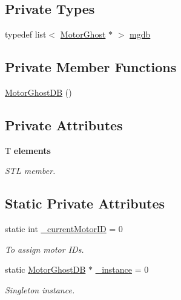 \subsection*{Private Types}
\begin{DoxyCompactItemize}
\item 
typedef list$<$ \hyperlink{classMotorGhost}{Motor\+Ghost} $\ast$ $>$ \hyperlink{classMotorGhostDB_aba9303a159c2a7c47299b005604a9fab}{mgdb}
\end{DoxyCompactItemize}
\subsection*{Private Member Functions}
\begin{DoxyCompactItemize}
\item 
\hyperlink{classMotorGhostDB_a41b6fa66ce424e660cf21fb5f1473e41}{Motor\+Ghost\+D\+B} ()
\end{DoxyCompactItemize}
\subsection*{Private Attributes}
\begin{DoxyCompactItemize}
\item 
T {\bfseries elements}
\begin{DoxyCompactList}\small\item\em S\+T\+L member. \end{DoxyCompactList}\end{DoxyCompactItemize}
\subsection*{Static Private Attributes}
\begin{DoxyCompactItemize}
\item 
static int \hyperlink{classMotorGhostDB_a6635d3851ef3644e1d3db269776d9344}{\+\_\+current\+Motor\+I\+D} = 0
\begin{DoxyCompactList}\small\item\em To assign motor I\+Ds. \end{DoxyCompactList}\item 
static \hyperlink{classMotorGhostDB}{Motor\+Ghost\+D\+B} $\ast$ \hyperlink{classMotorGhostDB_aa7624b432ffda929888975ee71cd2d84}{\+\_\+instance} = 0
\begin{DoxyCompactList}\small\item\em Singleton instance. \end{DoxyCompactList}\end{DoxyCompactItemize}


